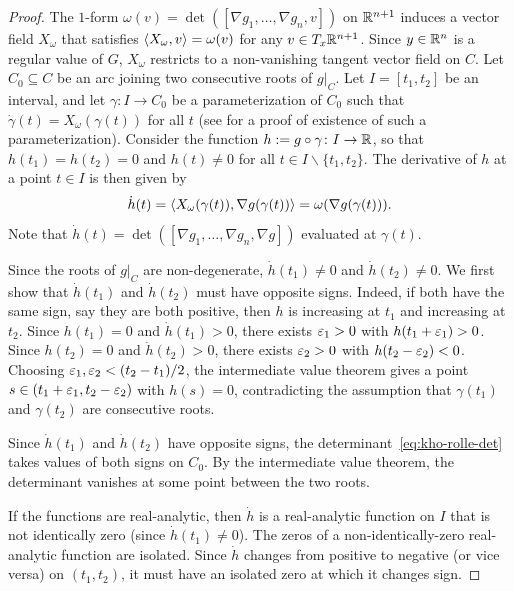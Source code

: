 \begin{proof}
The $1$-form $\omega(v) = \det([\nabla g_1, \ldots, \nabla g_n, v])$ on $\mathbb{R}^{n+1}$ induces a vector field $X_{\omega}$ that satisfies $\langle {X_{\omega}}, {v} \rangle = \omega(v)$ for any $v \in T_{x}\mathbb{R}^{n+1}$. Since $y \in \mathbb{R}^n$ is a regular value of $G$, $X_{\omega}$ restricts to a non-vanishing tangent vector field on $C$.
Let $C_0 \subseteq C$ be an arc joining two consecutive roots of $g|_C$. Let $I=[t_1,t_2]$ be an interval, and let $\gamma : I \rightarrow C_0$ be a parameterization of $C_0$ such that $\dot{\gamma}(t) = X_{\omega}(\gamma(t))$ for all $t$ (see \cite[Chapter 14]{tu2011manifolds} for a proof of existence of such a parameterization). Consider the function $h := g \circ \gamma\colon I \rightarrow \mathbb{R}$, so that $h(t_1) = h(t_2) = 0$ and $h(t)\neq 0$ for all $t\in I\backslash \{t_1, t_2\}$.
The derivative of $h$ at a point $t \in I$ is then given by
\begin{equation*}
  \dot{h}(t) = \langle {X_{\omega}(\gamma(t))}, {\nabla g(\gamma(t))} \rangle = \omega(\nabla g(\gamma(t))).
\end{equation*}
Note that $\dot{h}(t) = \det([\nabla g_1, \ldots, \nabla g_n, \nabla g])$ evaluated at $\gamma(t)$.

Since the roots of $g|_C$ are non-degenerate, $\dot{h}(t_1) \neq 0$ and $\dot{h}(t_2) \neq 0$. We first show that $\dot{h}(t_1)$ and $\dot{h}(t_2)$ must have opposite signs. Indeed, if both have the same sign, say they are both positive, then $h$ is increasing at $t_1$ and increasing at $t_2$. Since $h(t_1) = 0$ and $\dot{h}(t_1) > 0$, there exists $\varepsilon_1 > 0$ with $h(t_1 + \varepsilon_1) > 0$. Since $h(t_2) = 0$ and $\dot{h}(t_2) > 0$, there exists $\varepsilon_2 > 0$ with $h(t_2 - \varepsilon_2) < 0$. Choosing $\varepsilon_1, \varepsilon_2 < (t_2-t_1)/2$, the intermediate value theorem gives a point $s\in (t_1+\varepsilon_1, t_2-\varepsilon_2)$ with $h(s) = 0$, contradicting the assumption that $\gamma(t_1)$ and $\gamma(t_2)$ are consecutive roots.

Since $\dot{h}(t_1)$ and $\dot{h}(t_2)$ have opposite signs, the determinant~\eqref{eq:kho-rolle-det} takes values of both signs on $C_0$. By the intermediate value theorem, the determinant vanishes at some point between the two roots.

If the functions are real-analytic, then $\dot{h}$ is a real-analytic function on $I$ that is not identically zero (since $\dot{h}(t_1)\neq 0$). The zeros of a non-identically-zero real-analytic function are isolated. Since $\dot{h}$ changes from positive to negative (or vice versa) on $(t_1, t_2)$, it must have an isolated zero at which it changes sign.
\end{proof}

